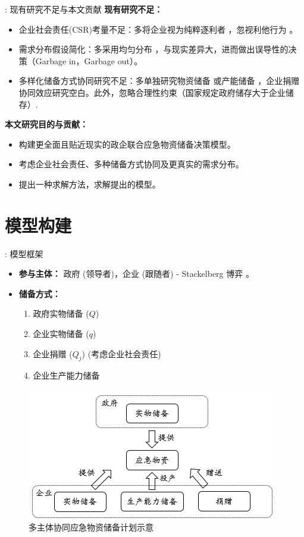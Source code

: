 \documentclass[9pt]{beamer}
\begin{document}
\begin{frame}{\insertsectionhead: 现有研究不足与本文贡献}
    \textbf{现有研究不足：}
    \begin{itemize}
        \item 企业社会责任(CSR)考量不足：多将企业视为纯粹逐利者 \cite{Li2022Stackelberg, Chen2023Contract}，忽视利他行为 \cite{zhengh2023}。
        \item 需求分布假设简化：多采用均匀分布 \cite{chai2021考虑储备周期, chen2014突发事件灾前应急物资政企联合储备模式}，与现实差异大，进而做出误导性的决策（Garbage in，Garbage out）。
        \item 多样化储备方式协同研究不足：多单独研究物资储备 \cite{Li2022Stackelberg, li2022政企联合储备, Chen2023Contract} 或产能储备 \cite{Gong2024Quantity}，企业捐赠协同效应研究空白。此外，忽略合理性约束（国家规定政府储存大于企业储存\cite{sfdrrmc2024}）.
    \end{itemize}
    \textbf{本文研究目的与贡献：}
    \begin{itemize}
        \item 构建更全面且贴近现实的政企联合应急物资储备决策模型。
        \item 考虑企业社会责任、多种储备方式协同及更真实的需求分布。
        \item 提出一种求解方法，求解提出的模型。
    \end{itemize}
\end{frame}

\section{模型构建}
\begin{frame}{\insertsectionhead: 模型框架}
    \begin{itemize}
        \item \textbf{参与主体：} 政府 (领导者)，企业 (跟随者) - Stackelberg 博弈 \cite{Li2022Stackelberg}。
        \item \textbf{储备方式：}
            \begin{enumerate}
                \item 政府实物储备 ($Q$)
                \item 企业实物储备 ($q$)
                \item 企业捐赠 ($Q_j$) (考虑企业社会责任)
                \item 企业生产能力储备
            \end{enumerate}
    \end{itemize}
    \begin{figure}
        \centering
        \includegraphics[width=0.6\linewidth]{basic_pictures/结构图.png}
        \caption{多主体协同应急物资储备计划示意}
    \end{figure}
\end{frame}
\end{document}
